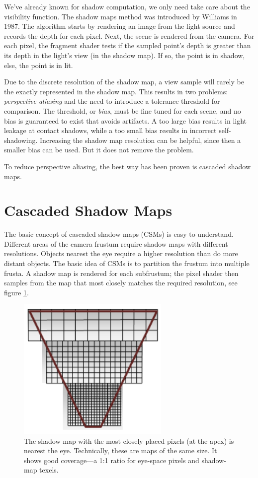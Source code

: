 We've already known for shadow computation, we only need take care about the visibility function. The shadow maps method was introduced by Williams in 1987\cite{a:Castingcurvedshadowsoncurvedsurfaces}. The algorithm starts by rendering an image from the light source and records the depth for each pixel. Next, the scene is rendered from the camera. For each pixel, the fragment shader tests if the sampled point's depth is greater than its depth in the light's view (in the shadow map). If so, the point is in shadow, else, the point is in lit.

Due to the discrete resolution of the shadow map, a view sample will rarely be the exactly represented in the shadow map. This results in two problems: \textit{perspective aliasing} and the need to introduce a tolerance threshold for comparison. The threshold, or \textit{bias}, must be fine tuned for each scene, and no bias is guaranteed to exist that avoids artifacts. A too large bias results in light leakage at contact shadows, while a too small bias results in incorrect self-shadowing. Increasing the shadow map resolution can be helpful, since then a smaller bias can be used. But it does not remove the problem.

To reduce perspective aliasing, the best way has been proven is cascaded shadow maps.


\section{Cascaded Shadow Maps}
The basic concept of cascaded shadow maps (CSMs) is easy to understand. Different areas of the camera frustum require shadow maps with different resolutions. Objects nearest the eye require a higher resolution than do more distant objects. The basic idea of CSMs is to partition the frustum into multiple frusta. A shadow map is rendered for each subfrustum; the pixel shader then samples from the map that most closely matches the required resolution, see figure \ref{f:cascaded-shadow-map}.

\begin{figure}
\sidecaption
	\includegraphics[width=0.65\textwidth]{graphics/shadows/cascaded-shadow-map}
	\caption{The shadow map with the most closely placed pixels (at the apex) is nearest the eye. Technically, these are maps of the same size. It shows good coverage—a 1:1 ratio for eye-space pixels and shadow-map texels.}
	\label{f:cascaded-shadow-map}
\end{figure}

